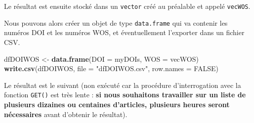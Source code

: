 \documentclass[
]{book}
\newenvironment{Shaded}{\begin{snugshade}}{\end{snugshade}}
\newcommand{\ControlFlowTok}[1]{\textcolor[rgb]{0.13,0.29,0.53}{\textbf{#1}}}
\newcommand{\DataTypeTok}[1]{\textcolor[rgb]{0.13,0.29,0.53}{#1}}
\newcommand{\DecValTok}[1]{\textcolor[rgb]{0.00,0.00,0.81}{#1}}
\newcommand{\KeywordTok}[1]{\textcolor[rgb]{0.13,0.29,0.53}{\textbf{#1}}}
\newcommand{\NormalTok}[1]{#1}
\newcommand{\OperatorTok}[1]{\textcolor[rgb]{0.81,0.36,0.00}{\textbf{#1}}}
\newcommand{\OtherTok}[1]{\textcolor[rgb]{0.56,0.35,0.01}{#1}}
\newcommand{\StringTok}[1]{\textcolor[rgb]{0.31,0.60,0.02}{#1}}
\begin{document}
Le résultat est ensuite stocké dans un \texttt{vector} créé au préalable et appelé \texttt{vecWOS}.

\begin{Shaded}
\end{Shaded}

Nous pouvons alors créer un objet de type \texttt{data.frame} qui va contenir les numéros DOI et les numéros WOS, et éventuellement l'exporter dans un fichier CSV.

\begin{Shaded}
\begin{Highlighting}[]
\NormalTok{dfDOIWOS <-}\StringTok{ }\KeywordTok{data.frame}\NormalTok{(}\DataTypeTok{DOI =}\NormalTok{ myDOIs, }\DataTypeTok{WOS =}\NormalTok{ vecWOS)}
\KeywordTok{write.csv}\NormalTok{(dfDOIWOS, }\DataTypeTok{file =} \StringTok{"dfDOIWOS.csv"}\NormalTok{, }\DataTypeTok{row.names =} \OtherTok{FALSE}\NormalTok{)}
\end{Highlighting}
\end{Shaded}

Le résultat est le suivant (non exécuté car la procédure d'interrogation avec la fonction \texttt{GET()} est très lente : \textbf{si nous souhaitons travailler sur un liste de plusieurs dizaines ou centaines d'articles, plusieurs heures seront nécessaires} avant d'obtenir le résultat).
\end{document}
